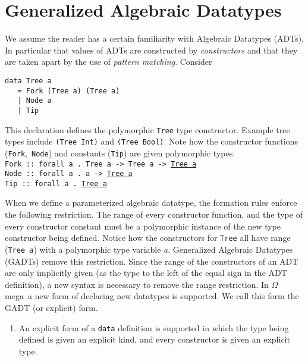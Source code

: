\documentclass[11pt,twoside]{article}
\newcommand{\om}{$\Omega$mega}
\begin{document}
\section{Generalized Algebraic Datatypes} \label{gadt}

We assume the reader has a certain familiarity with Algebraic Datatypes
(ADTs). In particular that values of ADTs are constructed by {\em constructors}
and that they are taken apart by the use of {\em pattern matching}. Consider

\begin{verbatim}
data Tree a 
   = Fork (Tree a) (Tree a) 
   | Node a 
   | Tip
\end{verbatim}
This declaration defines the polymorphic {\tt Tree} type constructor. Example tree
types include {\tt (Tree Int)} and {\tt (Tree Bool)}. 
Note how the constructor functions ({\tt Fork},\ {\tt Node}) and constants ({\tt Tip})
are given polymorphic types.\vspace*{0.1in} \\ 
\noindent
{\tt Fork :: forall a . Tree a -> Tree a -> \underline{Tree a}}\\
{\tt Node :: forall a . a -> \underline{Tree a}}\\
{\tt Tip :: forall a . \underline{Tree a}} \vspace*{0.1in}

When we define a parameterized algebraic
datatype, the formation rules enforce the following restriction. The
range of every constructor function, and the type of every constructor
constant must be a polymorphic instance of the new type constructor being
defined. Notice how the constructors for {\tt Tree} all have range
({\tt Tree {\it a}}) with a polymorphic type variable {\it a}. 
Generalized Algebraic Datatypes (GADTs) remove this restriction.
Since the range of the constructors of an ADT are only implicitly
given (as the type to the left of the equal sign in the ADT definition),
a new syntax is necessary to remove the range restriction. In \om\
a new form of declaring new datatypes is supported. We call this form
the GADT (or explicit) form.
\begin{enumerate}

\item An explicit form of a {\tt data} definition is supported in which
the type being defined is given an explicit kind, and every constructor is
given an explicit type.

\end{enumerate}
\end{document}
